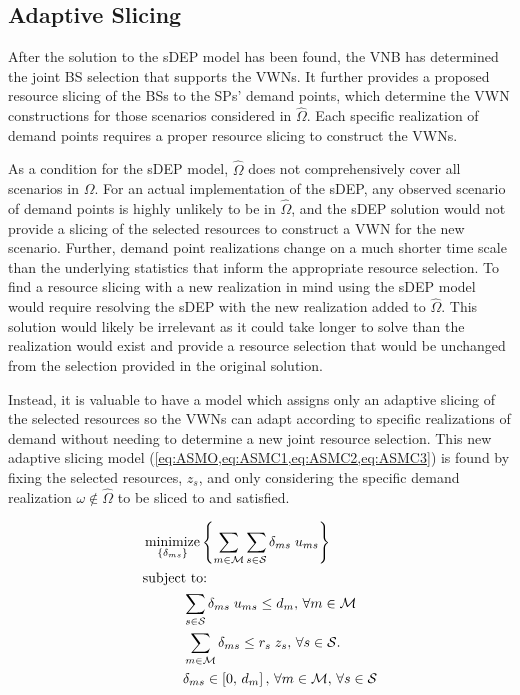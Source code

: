 \documentclass[12pt,dvipsnames]{report}
\DeclareMathOperator*{\argmin}{minimize}
\begin{document}
\subsection{Adaptive Slicing} \label{subsec:dep_slicing}

After the solution to the sDEP model has been found, the VNB has determined the joint BS selection that supports the VWNs.  It further provides a proposed resource slicing of the BSs to the SPs' demand points, which determine the VWN constructions for those scenarios considered in $\hat{\Omega}$.  Each specific realization of demand points requires a proper resource slicing to construct the VWNs.

As a condition for the sDEP model, $\hat{\Omega}$ does not comprehensively cover all scenarios in $\Omega$.  For an actual implementation of the sDEP, any observed scenario of demand points is highly unlikely to be in $\hat{\Omega}$, and the sDEP solution would not provide a slicing of the selected resources to construct a VWN for the new scenario.  Further, demand point realizations change on a much shorter time scale than the underlying statistics that inform the appropriate resource selection.  To find a resource slicing with a new realization in mind using the sDEP model would require resolving the sDEP with the new realization added to $\hat{\Omega}$.  This solution would likely be irrelevant as it could take longer to solve than the realization would exist and provide a resource selection that would be unchanged from the selection provided in the original solution.

Instead, it is valuable to have a model which assigns only an adaptive slicing of the selected resources so the VWNs can adapt according to specific realizations of demand without needing to determine a new joint resource selection.  This new adaptive slicing model (\cref{eq:ASMO,eq:ASMC1,eq:ASMC2,eq:ASMC3}) is found by fixing the selected resources, $z_s$, and only considering the specific demand realization $\omega \notin \hat{\Omega}$ to be sliced to and satisfied.

\begin{tcolorbox}[floatplacement = !ht, float, title = Adaptive Slicing Model]
\begin{align}
& \argmin_{\left\{ \delta_{ms} \right\}} \left\{ \sum_{m \in \mathcal{M}} \sum_{s \in \mathcal{S}} \delta_{ms} \; u_{ms} \right\} \label{eq:ASMO}\\
& \text{subject to:}  \nonumber \\
& \hspace{0.4in} \sum_{s \in \mathcal{S}} \delta_{ms} \; u_{ms} \leq d_m,\, \forall m \in \mathcal{M} \label{eq:ASMC1}\\
& \hspace{0.4in} \sum_{m \in \mathcal{M}} \delta_{ms} \leq r_s \; z_s,\, \forall s \in \mathcal{S}. \label{eq:ASMC2}\\
& \hspace{0.4in} \delta_{ms} \in \left[ 0,\, d_m \right],\, \forall m \in \mathcal{M},\, \forall s \in \mathcal{S} \label{eq:ASMC3}
\end{align}
\end{tcolorbox}
\end{document}
